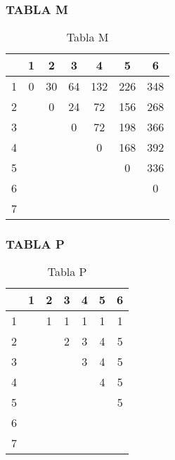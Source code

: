 \documentclass[10]{beamer}
\begin{document}
\begin{frame}\frametitle{TABLA M}
 \color{white}
\begin{table}
 \begin{tabular}{ c | c  | c  | c  | c  | c  | c }
 \\    & 1   & 2   & 3   & 4   & 5   & 6  \\ 
 \hline \hline 
  1 & 0& 30& 64& 132& 226& 348 \\ 
  2  & & 0& 24& 72& 156& 268 \\ 
  3  &  & & 0& 72& 198& 366 \\ 
  4  &  &  & & 0& 168& 392 \\ 
  5  &  &  &  & & 0& 336 \\ 
  6  &  &  &  &  & & 0 \\ 
  7  &  &  &  &  &  &  \\ 
  
 \end{tabular}
 \color{white}
\caption{Tabla M}
 \end{table}
 \end{frame} 
\begin{frame}\frametitle{TABLA P}
 \color{white}
\begin{table}
 \begin{tabular}{ c | c  | c  | c  | c  | c  | c }
 \\    & 1   & 2   & 3   & 4   & 5   & 6  \\ 
 \hline \hline 
  1  & & 1& 1& 1& 1& 1 \\ 
  2  &  & & 2& 3& 4& 5 \\ 
  3  &  &  & & 3& 4& 5 \\ 
  4  &  &  &  & & 4& 5 \\ 
  5  &  &  &  &  & & 5 \\ 
  6  &  &  &  &  &  &  \\ 
  7  &  &  &  &  &  &  \\ 
  
 \end{tabular}
 \color{white}
\caption{Tabla P}
 \end{table}
 \end{frame} 
\end{document}
